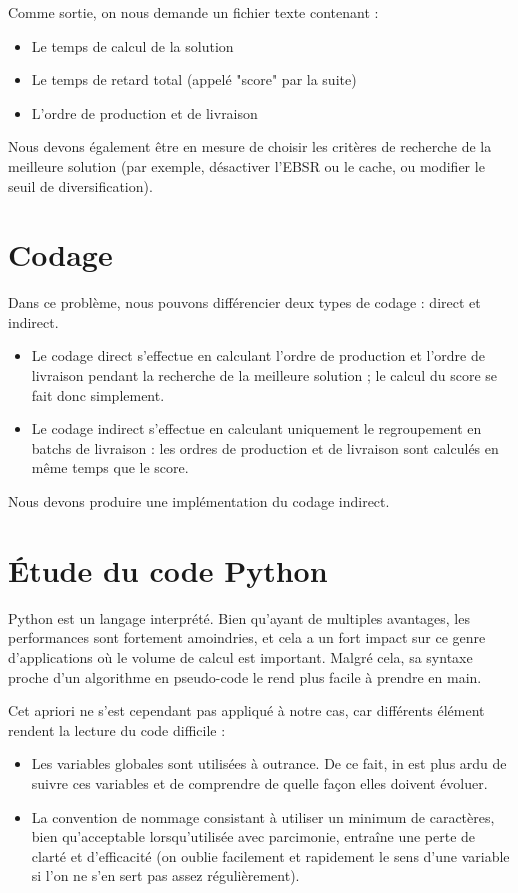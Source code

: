 \documentclass[hideweeklyreports]{polytech/polytech}
\begin{document}
			Comme sortie, on nous demande un fichier texte contenant :
			\begin{itemize}
				\item Le temps de calcul de la solution
				\item Le temps de retard total (appelé "score" par la suite)
				\item L'ordre de production et de livraison
			\end{itemize}
			
			Nous devons également être en mesure de choisir les critères de recherche de la meilleure solution (par exemple, désactiver l'EBSR ou le cache, ou modifier le seuil de diversification).
			
		\section{Codage}
			Dans ce problème, nous pouvons différencier deux types de codage : direct et indirect.
			\begin{itemize}
				\item Le codage direct s'effectue en calculant l'ordre de production et l'ordre de livraison pendant la recherche de la meilleure solution ; le calcul du score se fait donc simplement.
				\item Le codage indirect s'effectue en calculant uniquement le regroupement en batchs de livraison : les ordres de production et de livraison sont calculés en même temps que le score.
			\end{itemize}
			
			Nous devons produire une implémentation du codage indirect.
			
		
		\section{Étude du code Python}
			Python est un langage interprété. Bien qu'ayant de multiples avantages, les performances sont fortement amoindries, et cela a un fort impact sur ce genre d'applications où le volume de calcul est important. Malgré cela, sa syntaxe proche d'un algorithme en pseudo-code le rend plus facile à prendre en main.
			
			Cet apriori ne s'est cependant pas appliqué à notre cas, car différents élément rendent la lecture du code difficile :
			\begin{itemize}
				\item Les variables globales sont utilisées à outrance. De ce fait, in est plus ardu de suivre ces variables et de comprendre de quelle façon elles doivent évoluer.
				\item La convention de nommage consistant à utiliser un minimum de caractères, bien qu'acceptable lorsqu'utilisée avec parcimonie, entraîne une perte de clarté et d'efficacité (on oublie facilement et rapidement le sens d'une variable si l'on ne s'en sert pas assez régulièrement).
			\end{itemize}
			
\end{document}
